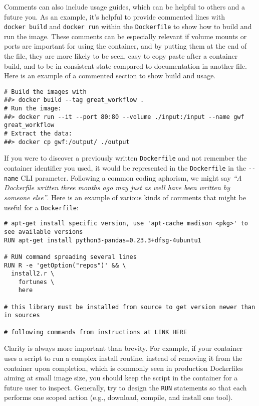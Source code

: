 \documentclass[10pt,letterpaper]{article}
\begin{document}
Comments can also include usage guides, which can be helpful to others
and a future you. As an example, it's helpful to provide commented lines
with \texttt{docker\ build} and \texttt{docker\ run} within the
\texttt{Dockerfile} to show how to build and run the image. These
comments can be especially relevant if volume mounts or ports are
important for using the container, and by putting them at the end of the
file, they are more likely to be seen, easy to copy paste after a
container build, and to be in consistent state compared to documentation
in another file. Here is an example of a commented section to show build
and usage.

\begin{verbatim}
# Build the images with
##> docker build --tag great_workflow .
# Run the image:
##> docker run --it --port 80:80 --volume ./input:/input --name gwf great_workflow
# Extract the data:
##> docker cp gwf:/output/ ./output
\end{verbatim}

If you were to discover a previously written \texttt{Dockerfile} and not
remember the container identifier you used, it would be represented in
the \texttt{Dockerfile} in the \texttt{-\/-name} CLI parameter.
Following a common coding aphorism, we might say \emph{``A Dockerfile
written three months ago may just as well have been written by someone
else''}. Here is an example of various kinds of comments that might be
useful for a \texttt{Dockerfile}:

\begin{verbatim}
# apt-get install specific version, use 'apt-cache madison <pkg>' to see available versions
RUN apt-get install python3-pandas=0.23.3+dfsg-4ubuntu1

# RUN command spreading several lines
RUN R -e 'getOption("repos")' && \
  install2.r \
    fortunes \
    here

# this library must be installed from source to get version newer than in sources

# following commands from instructions at LINK HERE
\end{verbatim}

Clarity is always more important than brevity. For example, if your
container uses a script to run a complex install routine, instead of
removing it from the container upon completion, which is commonly seen
in production Dockerfiles aiming at small image size, you should keep
the script in the container for a future user to inspect. Generally, try
to design the \texttt{RUN} statements so that each performs one scoped
action (e.g., download, compile, and install one tool).
\end{document}

